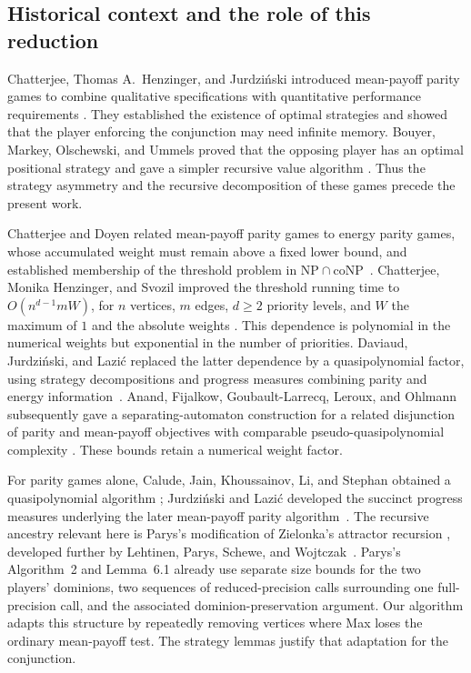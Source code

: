 \subsection{Historical context and the role of this reduction}
\label{sec:history}

Chatterjee, Thomas A.~Henzinger, and Jurdzi\'nski introduced
mean-payoff parity games to combine qualitative specifications with
quantitative performance requirements
\cite{ChatterjeeHenzingerJurdzinski2005}. They established the existence
of optimal strategies and showed that the player enforcing the
conjunction may need infinite memory. Bouyer, Markey, Olschewski,
and Ummels proved that the opposing player has an optimal positional
strategy and gave a simpler recursive value algorithm
\cite[Theorems~2 and~7]{BouyerMarkeyOlschewskiUmmels2011}.
Thus the strategy asymmetry and the recursive decomposition of these
games precede the present work.

Chatterjee and Doyen related mean-payoff parity games to energy parity
games, whose accumulated weight must remain above a fixed lower bound,
and established membership of the threshold problem in
$\mathrm{NP}\cap\mathrm{coNP}$~\cite{ChatterjeeDoyen2012}.
Chatterjee, Monika Henzinger, and Svozil improved the threshold
running time to $O(n^{d-1}mW)$, for $n$ vertices, $m$ edges,
$d\ge2$ priority levels, and $W$ the maximum of $1$ and the absolute weights
\cite[Theorem~6]{ChatterjeeHenzingerSvozil2017}.
This dependence is polynomial in the numerical weights but
exponential in the number of priorities. Daviaud, Jurdzi\'nski,
and Lazi\'c replaced the latter dependence by a quasipolynomial
factor, using strategy decompositions and progress measures combining
parity and energy information~\cite{DaviaudJurdzinskiLazic2018}.
Anand, Fijalkow, Goubault-Larrecq, Leroux, and Ohlmann subsequently
gave a separating-automaton construction for a related disjunction
of parity and mean-payoff objectives
with comparable pseudo-quasipolynomial complexity
\cite{AnandEtAl2021}. These bounds retain a numerical weight factor.

For parity games alone, Calude, Jain, Khoussainov, Li, and Stephan
obtained a quasipolynomial algorithm
\cite{CaludeEtAl2017}; Jurdzi\'nski and Lazi\'c developed the
succinct progress measures underlying the later mean-payoff parity
algorithm~\cite{JurdzinskiLazic2017}. The recursive ancestry relevant
here is Parys's modification of Zielonka's attractor recursion
\cite{Parys2019}, developed further by Lehtinen, Parys, Schewe,
and Wojtczak~\cite{LehtinenParysScheweWojtczak2022}.
Parys's Algorithm~2 and Lemma~6.1 already use separate size bounds
for the two players' dominions, two sequences of reduced-precision
calls surrounding one full-precision call, and the associated
dominion-preservation argument. Our algorithm adapts this structure
by repeatedly removing vertices where Max loses the ordinary
mean-payoff test. The strategy lemmas justify that adaptation for
the conjunction.

